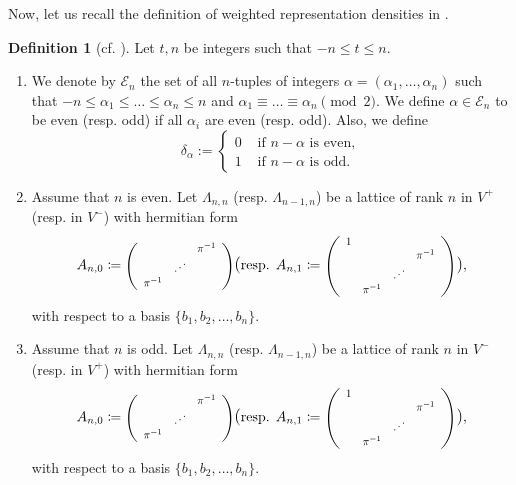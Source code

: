 \documentclass[11pt,oneside]{amsart}
\theoremstyle{plain}
\theoremstyle{definition}
\newtheorem{definition}[theorem]{Definition}
\theoremstyle{remark}
\newcommand{\CE}{{\mathcal E}}
\numberwithin{equation}{section}
\begin{document}
	
	Now, let us recall the definition of weighted representation densities in \cite{Cho}.
	\begin{definition}[cf. {\cite[Definition 3.1]{Cho}}]\label{definition2.1} Let $t,n$ be integers such that $-n \leq t \leq n$. \begin{enumerate}
			\item We denote by $\CE_n$ the set of all $n$-tuples of integers $\alpha=(\alpha_1,\dots,\alpha_n)$ such that  $-n \leq \alpha_1 \leq \dots \leq \alpha_n \leq n$ and $\alpha_1 \equiv \dots \equiv \alpha_n \pmod{2}$. We define $\alpha \in \CE_n$ to be even (resp. odd) if all $\alpha_i$ are even (resp. odd). Also, we define
			\begin{equation*}
				\delta_{\alpha}:=\left\lbrace \begin{array}{ll} 0 & \text{ if } n-\alpha \text{ is even},\\  1 & \text{ if } n-\alpha \text{ is odd}. \end{array}\right.
			\end{equation*}
			
			
			\item Assume that $n$ is even. Let $\Lambda_{n,n}$ (resp. $\Lambda_{n-1,n}$) be a lattice of rank $n$ in $V^+$ (resp. in $V^{-}$) with hermitian form 
			\begin{equation*}
				A_{n,0}\coloneqq \scalebox{0.8}{$\left(\begin{array}{ccc}  && \pi^{-1}\\
						& \iddots &\\
						\pi^{-1} &&
					\end{array}\right)$} \mathlarger{(}\text{resp. }	A_{n,1}\coloneqq \scalebox{0.8}{$\left(\begin{array}{cccc} 1  &&&\\ &&&\pi^{-1}\\
						&& \iddots &\\
						&\pi^{-1} &&
					\end{array}\right)$} \mathlarger{)},
			\end{equation*}
			with respect to a basis $\lbrace b_1, b_2,\dots, b_n \rbrace$.
			
			\item Assume that $n$ is odd. Let $\Lambda_{n,n}$ (resp. $\Lambda_{n-1,n}$) be a lattice of rank $n$ in $V^-$ (resp. in $V^{+}$) with hermitian form 
			\begin{equation*}
				A_{n,0}\coloneqq \scalebox{0.8}{$\left(\begin{array}{ccc}  && \pi^{-1}\\
						& \iddots &\\
						\pi^{-1} &&
					\end{array}\right)$} \mathlarger{(}\text{resp. }	A_{n,1}\coloneqq \scalebox{0.8}{$\left(\begin{array}{cccc} 1  &&&\\ &&&\pi^{-1}\\
						&& \iddots &\\
						&\pi^{-1} &&
					\end{array}\right)$} \mathlarger{)},
			\end{equation*}
			with respect to a basis $\lbrace b_1, b_2,\dots, b_n \rbrace$.
			

\end{enumerate}
\end{definition}
\end{document}

